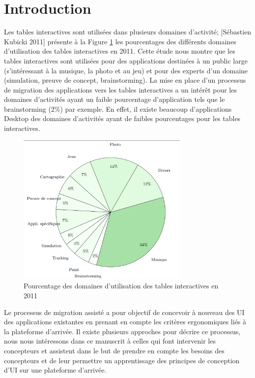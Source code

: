 \section{Introduction}


Les tables interactives sont utilis\'{e}es dans plusieurs domaines
d'activit\'{e}; [S\'{e}bastien Kubicki 2011] pr\'{e}sente \`{a} la Figure
\ref{fig:1} les pourcentages des diff\'{e}rents domaines d'utilisation des tables
interactives en 2011. Cette \'{e}tude nous montre que les tables interactives
sont utilis\'{e}es pour des applications destin\'{e}es \`{a} un public large
(s'int\'{e}ressant \`{a} la musique, la photo et au jeu) et pour des experts d'un
domaine (simulation, preuve de concept, brainstorming). La mise en place d'un
processus de migration des applications vers les tables interactives a un
int\'{e}r\^{e}t pour les domaines d'activit\'{e}s ayant un faible pourcentage
d'application tels que le brainstorming (2\%) par exemple. En effet, il existe
beaucoup d'applications Desktop des domaines d'activit\'{e}s ayant de faibles
pourcentages pour les tables interactives.

\begin{figure}[h]
\begin{center}
\includegraphics[width=239pt]{chap1/img-3}
\caption{Pourcentage des domaines d'utilisation des tables interactives en
2011}\label{fig:1}
\end{center}
\end{figure}

Le processus de migration assist\'{e} a pour objectif de concevoir \`{a} nouveau
des UI des applications existantes en prenant en compte les crit\`{e}res
ergonomiques li\'{e}s \`{a} la plateforme d'arriv\'{e}e. Il existe plusieurs
approches pour d\'{e}crire ce processus, nous nous int\'{e}ressons dans ce
manuscrit \`{a} celles qui font intervenir les concepteurs et assistent dans le
but de prendre en compte les besoins des concepteurs et de leur permettre un
apprentissage des principes de conception d'UI sur une plateforme d'arriv\'{e}e.


